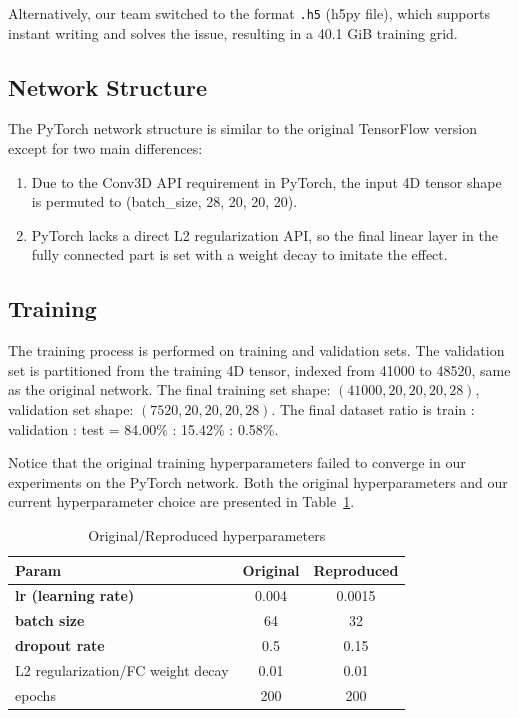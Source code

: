 \documentclass[unnumsec,webpdf,contemporary,large]{oup-authoring-template}
\theoremstyle{thmstyleone}%
\theoremstyle{thmstyletwo}%
\theoremstyle{thmstylethree}%
\begin{document}
Alternatively, our team switched to the format \texttt{.h5} (h5py file), which supports instant writing and solves the issue, resulting in a 40.1 GiB training grid.

\subsection{Network Structure}
The PyTorch network structure is similar to the original TensorFlow version except for two main differences:
\begin{enumerate}
    \item Due to the Conv3D API requirement in PyTorch, the input 4D tensor shape is permuted to (batch\_size, 28, 20, 20, 20).
    \item PyTorch lacks a direct L2 regularization API, so the final linear layer in the fully connected part is set with a weight decay to imitate the effect.
\end{enumerate}

\subsection{Training}
The training process is performed on training and validation sets. The validation set is partitioned from the training 4D tensor, indexed from 41000 to 48520, same as the original network. The final training set shape: $(41000, 20, 20, 20, 28)$, validation set shape: $(7520, 20, 20, 20, 28)$. The final dataset ratio is train : validation : test = 84.00\% : 15.42\% : 0.58\%.

Notice that the original training hyperparameters failed to converge in our experiments on the PyTorch network. Both the original hyperparameters and our current hyperparameter choice are presented in Table~\ref{tab:hyperparams}.

\begin{table}[!t]
\centering
\caption{Original/Reproduced hyperparameters}
\label{tab:hyperparams}
\begin{tabular}{lcc}
\toprule
Param & Original & Reproduced \\
\midrule
\textbf{lr (learning rate)} & 0.004 & 0.0015 \\
\textbf{batch size} & 64 & 32 \\
\textbf{dropout rate} & 0.5 & 0.15 \\
L2 regularization/FC weight decay & 0.01 & 0.01 \\
epochs & 200 & 200 \\
\bottomrule
\end{tabular}
\end{table}
\end{document}

